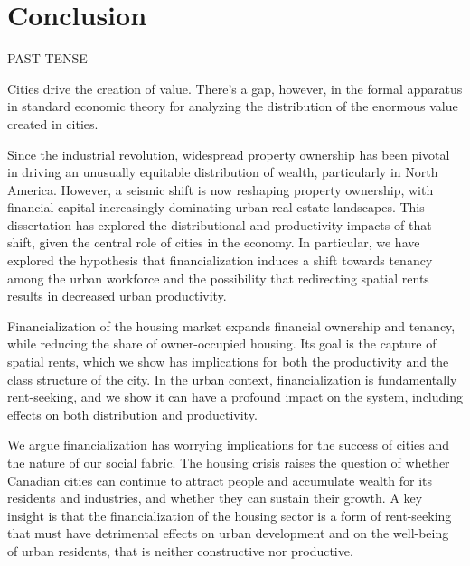 \chapter{Conclusion} \label{chapter-conclusions}



PAST TENSE

Cities drive the creation of value.
There's a gap, however, in the formal apparatus in standard economic theory for analyzing the distribution of the enormous value created in cities. 

Since the industrial revolution, widespread property ownership  has been pivotal in driving an unusually equitable distribution of wealth, particularly in North America. However, a seismic shift is now reshaping property ownership, with financial capital increasingly dominating urban real estate landscapes. This dissertation has explored the distributional and productivity impacts of that shift, given the central role of cities in the economy. In particular, we have explored the hypothesis that financialization induces a shift towards tenancy among the urban workforce and the possibility that redirecting spatial rents results in decreased urban productivity. 

Financialization of the housing market %
expands financial ownership and tenancy, while reducing the share of owner-occupied housing. Its goal is the capture of spatial rents, which we show has implications for both the productivity and the class structure of the city. 
In the urban context, financialization is fundamentally \gls{rent-seeking}, and we show it can have a profound impact on the system, including effects on both distribution and productivity. 


We argue financialization %
has worrying implications for the success of cities and the nature of our social fabric. 
The housing crisis raises the question of whether Canadian cities can continue to attract people and accumulate wealth for its residents and industries, and whether they can sustain their growth.
A key insight is that the financialization of the housing sector is a form of \gls{rent-seeking} that must have detrimental effects on urban development and on the well-being of urban residents, that is neither constructive nor productive.


